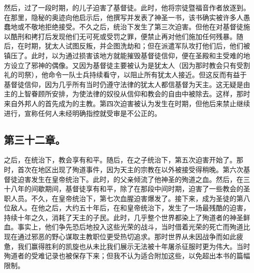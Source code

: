然后，过了一段时期，的儿子迫害了基督徒。此时，他将宗徒暨福音作者放逐到。在那里，隐秘的奥迹向他启示后，他撰写并发表了神圣一书，该书确实被许多人愚蠢地或不敬地拒绝接受。不久之后，统治下发生了第三次迫害。但他在对基督徒施以酷刑和拷打后发现他们无可死或受罚之罪，便禁止再对他们施加任何残暴。随后，在时期，犹太人试图反叛，并企图洗劫和；但在派遣军队攻打他们后，他们被镇压了。此时，以为通过损害该地方就能摧毁基督徒信仰，便在圣殿和主受难的地方设立了邪神的偶像。又因为基督徒主要被认为是犹太人（因为那时教会只有受割礼的司祭），他命令一队士兵持续看守，以阻止所有犹太人接近。但这反而有益于基督徒信仰，因为几乎所有当时仍遵守法律的犹太人都信基督为天主。这无疑是由主的上智眷顾所安排，为使法律的奴役从信仰和教会的自由中被除去。这样，那时来自外邦人的首先成为的主教。第四次迫害被认为发生在时期，但他后来禁止继续进行，宣称任何人未经明确指控就受审是不公正的。\par


\subsection{第三十二章。}

之后，在统治下，教会享有和平。随后，在之子统治下，第五次迫害开始了。那时，首次在地区出现了殉道事件，因为天主的宗教在以外被接受得稍晚。第六次基督徒迫害发生在皇帝统治下。此时，的父亲倾流了他神圣的殉道之血。然后，在三十八年的间歇期间，基督徒享有和平，除了在那段中间时期，迫害了一些教会的圣职人员。不久，在皇帝统治下，第七次血腥迫害爆发了。接下来，成为圣徒的第八位敌人。在他之后，大约五十年后，在和皇帝统治下，发生了一场最残酷的迫害，持续十年之久，消耗了天主的子民。此时，几乎整个世界都染上了殉道者的神圣鲜血。事实上，他们争先恐后地投入这些光荣的战斗，当时借着光荣的死亡而殉道比现在通过邪恶的野心谋取主教职位更受热切追求。那时世界从未因战争而如此疲惫，我们赢得胜利的凯旋也从未比我们展示无法被十年屠杀征服时更为伟大。当时殉道者的受难记录也被保存下来；但我不认为适合附加这些，以免超出本书的篇幅限制。\par

